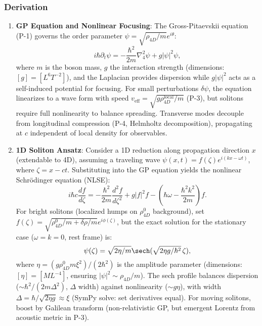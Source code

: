 \subsubsection{Derivation}
\begin{enumerate}
\item \textbf{GP Equation and Nonlinear Focusing}: The Gross-Pitaevskii equation (P-1) governs the order parameter $\psi = \sqrt{\rho_{4D}/m} e^{i \theta}$:
   \[
   i \hbar \partial_t \psi = -\frac{\hbar^2}{2 m} \nabla_4^2 \psi + g |\psi|^2 \psi,
   \]
   where $m$ is the boson mass, $g$ the interaction strength (dimensions: $[g] = [L^6 T^{-2}]$), and the Laplacian provides dispersion while $g |\psi|^2$ acts as a self-induced potential for focusing. For small perturbations $\delta \psi$, the equation linearizes to a wave form with speed $v_{\text{eff}} = \sqrt{g \rho_{4D}^{\text{local}} / m}$ (P-3), but solitons require full nonlinearity to balance spreading. Transverse modes decouple from longitudinal compression (P-4, Helmholtz decomposition), propagating at $c$ independent of local density for observables.

\item \textbf{1D Soliton Ansatz}: Consider a 1D reduction along propagation direction $x$ (extendable to 4D), assuming a traveling wave $\psi(x,t) = f(\zeta) e^{i (k x - \omega t)}$, where $\zeta = x - c t$. Substituting into the GP equation yields the nonlinear Schrödinger equation (NLSE):
   \[
   i \hbar c \frac{df}{d\zeta} = -\frac{\hbar^2}{2 m} \frac{d^2 f}{d\zeta^2} + g |f|^2 f - (\hbar \omega - \frac{\hbar^2 k^2}{2 m}) f.
   \]
   For bright solitons (localized humps on $\rho_{4D}^0$ background), set $f(\zeta) = \sqrt{\rho_{4D}^0 / m + \delta \rho / m} e^{i \phi(\zeta)}$, but the exact solution for the stationary case ($\omega = k = 0$, rest frame) is:
   \[
   \psi(\zeta) = \sqrt{2 \eta / m} \sech(\sqrt{2 \eta g / \hbar^2} \, \zeta),
   \]
   where $\eta = (g \rho_{4D}^0 m \xi^2) / (2 \hbar^2)$ is the amplitude parameter (dimensions: $[\eta] = [M L^{-4}]$, ensuring $|\psi|^2 \sim \rho_{4D}/m$). The sech profile balances dispersion ($\sim \hbar^2 / (2 m \Delta^2)$, $\Delta$ width) against nonlinearity ($\sim g \eta$), with width $\Delta = \hbar / \sqrt{2 \eta g} \approx \xi$ (SymPy solve: set derivatives equal). For moving solitons, boost by Galilean transform (non-relativistic GP, but emergent Lorentz from acoustic metric in P-3).


\end{enumerate}
